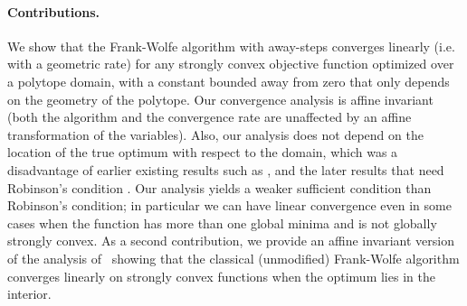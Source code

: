 \documentclass{article} %
\newcommand{\0}{\mathbf{0}} %
\begin{document}
\paragraph{Contributions.}
We show that the Frank-Wolfe algorithm with away-steps converges linearly (i.e. with a geometric rate) for any strongly convex objective function optimized over a polytope domain, with a constant bounded away from zero that only depends on the geometry of the polytope. Our convergence analysis is affine invariant (both the algorithm and the convergence rate are unaffected by an affine transformation of the variables). 
%
%
%
%
%
Also, our analysis does not depend on the location of the true optimum with respect to the domain, which was a disadvantage of earlier existing results such as \cite{Wolfe:1970wy,Guelat:1986fq,Beck:2004jm}, and the later results \cite{Ahipasaoglu:2008il,Kumar:2010ku,Allende:2013vw} that need Robinson's condition \cite{Robinson:1982ii}. Our analysis yields a weaker sufficient condition than Robinson's condition; in particular we can have linear convergence even in some cases when the function has more than one global minima and is not globally strongly convex.
As a second contribution, we provide an affine invariant version of the analysis of~\cite{Guelat:1986fq} showing that the classical (unmodified) Frank-Wolfe algorithm converges linearly on strongly convex functions when the optimum lies in the interior.

\vspace{-2mm}
\end{document}
